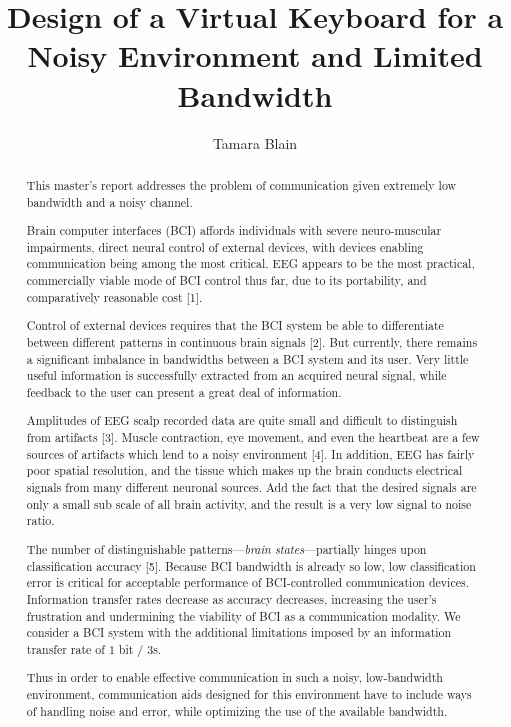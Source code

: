 \documentclass[12pt,titlepage]{article}
\begin{document}
\title{Design of a Virtual Keyboard for a Noisy Environment and Limited Bandwidth} %
\author{Tamara Blain}
\maketitle

\begin{abstract}
This master's report addresses the problem of communication given extremely low bandwidth and a 
noisy channel.

Brain computer interfaces (BCI) affords individuals with severe neuro-muscular impairments, 
direct neural control of external devices, with devices enabling communication being among 
the most critical.  EEG appears to be the most practical, commercially viable mode of BCI 
control thus far, due to its portability, and comparatively reasonable cost [1].

Control of external devices requires that the BCI system be able to differentiate between 
different patterns in continuous brain signals [2].  But currently, there remains a significant 
imbalance in bandwidths between a BCI system and its user.  Very little useful information is 
successfully extracted from an acquired neural signal, while feedback to the user can present a 
great deal of information.

Amplitudes of EEG scalp recorded data are quite small and difficult to distinguish from 
artifacts [3].  Muscle contraction, eye movement, and even the heartbeat are a few sources of 
artifacts which lend to a noisy environment [4].  In addition, EEG has fairly poor spatial 
resolution, and the tissue which makes up the brain conducts electrical signals from many 
different neuronal sources.  Add the fact that the desired signals are only a small sub scale of all 
brain activity, and the result is a very low signal to noise ratio.

The number of distinguishable patterns---\emph{brain states}---partially hinges upon classification 
accuracy [5].  Because BCI bandwidth is already so low, low classification error is critical for 
acceptable performance of BCI-controlled communication devices.  Information transfer rates 
decrease as accuracy decreases, increasing the user's frustration and  undermining the viability 
of BCI as a communication modality.   We consider a BCI system with the additional 
limitations imposed by an information transfer rate of $1$ bit $/$ $3$s.

Thus in order to enable effective communication in such a noisy, low-bandwidth environment, 
communication aids designed for this environment have to include ways of handling noise and 
error, while optimizing the use of the available bandwidth.


\end{abstract}
\end{document}
